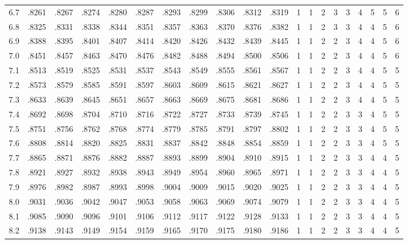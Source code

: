 {\begin{tabular}{|c|cccccccccc|ccccccccc|}
6.7 & .8261 & .8267 & .8274 & .8280 & .8287 & .8293 & .8299 & .8306 & .8312 & .8319 & 1 & 1 & 2 & 3 & 3 & 4 & 5 & 5 & 6 \\
6.8 & .8325 & .8331 & .8338 & .8344 & .8351 & .8357 & .8363 & .8370 & .8376 & .8382 & 1 & 1 & 2 & 3 & 3 & 4 & 4 & 5 & 6 \\
6.9 & .8388 & .8395 & .8401 & .8407 & .8414 & .8420 & .8426 & .8432 & .8439 & .8445 & 1 & 1 & 2 & 2 & 3 & 4 & 4 & 5 & 6 \\
7.0 & .8451 & .8457 & .8463 & .8470 & .8476 & .8482 & .8488 & .8494 & .8500 & .8506 & 1 & 1 & 2 & 2 & 3 & 4 & 4 & 5 & 6 \\
7.1 & .8513 & .8519 & .8525 & .8531 & .8537 & .8543 & .8549 & .8555 & .8561 & .8567 & 1 & 1 & 2 & 2 & 3 & 4 & 4 & 5 & 5 \\
7.2 & .8573 & .8579 & .8585 & .8591 & .8597 & .8603 & .8609 & .8615 & .8621 & .8627 & 1 & 1 & 2 & 2 & 3 & 4 & 4 & 5 & 5 \\
7.3 & .8633 & .8639 & .8645 & .8651 & .8657 & .8663 & .8669 & .8675 & .8681 & .8686 & 1 & 1 & 2 & 2 & 3 & 4 & 4 & 5 & 5 \\
7.4 & .8692 & .8698 & .8704 & .8710 & .8716 & .8722 & .8727 & .8733 & .8739 & .8745 & 1 & 1 & 2 & 2 & 3 & 3 & 4 & 5 & 5 \\
7.5 & .8751 & .8756 & .8762 & .8768 & .8774 & .8779 & .8785 & .8791 & .8797 & .8802 & 1 & 1 & 2 & 2 & 3 & 3 & 4 & 5 & 5 \\
7.6 & .8808 & .8814 & .8820 & .8825 & .8831 & .8837 & .8842 & .8848 & .8854 & .8859 & 1 & 1 & 2 & 2 & 3 & 3 & 4 & 5 & 5 \\
7.7 & .8865 & .8871 & .8876 & .8882 & .8887 & .8893 & .8899 & .8904 & .8910 & .8915 & 1 & 1 & 2 & 2 & 3 & 3 & 4 & 4 & 5 \\
7.8 & .8921 & .8927 & .8932 & .8938 & .8943 & .8949 & .8954 & .8960 & .8965 & .8971 & 1 & 1 & 2 & 2 & 3 & 3 & 4 & 4 & 5 \\
7.9 & .8976 & .8982 & .8987 & .8993 & .8998 & .9004 & .9009 & .9015 & .9020 & .9025 & 1 & 1 & 2 & 2 & 3 & 3 & 4 & 4 & 5 \\
8.0 & .9031 & .9036 & .9042 & .9047 & .9053 & .9058 & .9063 & .9069 & .9074 & .9079 & 1 & 1 & 2 & 2 & 3 & 3 & 4 & 4 & 5 \\
8.1 & .9085 & .9090 & .9096 & .9101 & .9106 & .9112 & .9117 & .9122 & .9128 & .9133 & 1 & 1 & 2 & 2 & 3 & 3 & 4 & 4 & 5 \\
8.2 & .9138 & .9143 & .9149 & .9154 & .9159 & .9165 & .9170 & .9175 & .9180 & .9186 & 1 & 1 & 2 & 2 & 3 & 3 & 4 & 4 & 5 \\

\end{tabular}}
